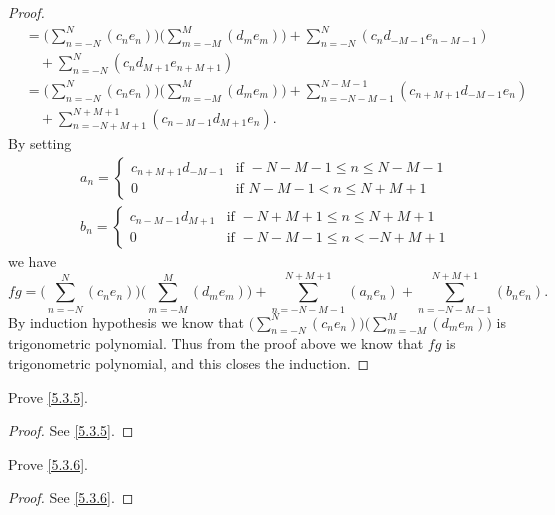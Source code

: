\begin{proof}
\begin{align*}
        & = \bigg(\sum_{n = -N}^N (c_n e_n)\bigg) \bigg(\sum_{m = -M}^M (d_m e_m)\bigg) + \sum_{n = -N}^N (c_n d_{-M - 1} e_{n - M - 1})                   \\
        & \quad + \sum_{n = -N}^N (c_n d_{M + 1} e_{n + M + 1})                                                                                            \\
        & = \bigg(\sum_{n = -N}^N (c_n e_n)\bigg) \bigg(\sum_{m = -M}^M (d_m e_m)\bigg) + \sum_{n = -N - M - 1}^{N - M - 1} (c_{n + M + 1} d_{-M - 1} e_n) \\
        & \quad + \sum_{n = -N + M + 1}^{N + M + 1} (c_{n - M - 1} d_{M + 1} e_n).
  \end{align*}
  By setting
  \begin{align*}
     & a_n = \begin{cases}
               c_{n + M + 1} d_{-M - 1} & \text{if } -N - M - 1 \leq n \leq N - M - 1 \\
               0                        & \text{if } N - M - 1 < n \leq N + M + 1
             \end{cases} \\
     & b_n = \begin{cases}
               c_{n - M - 1} d_{M + 1} & \text{if } -N + M + 1 \leq n \leq N + M + 1 \\
               0                       & \text{if } -N - M - 1 \leq n < -N + M + 1
             \end{cases}
  \end{align*}
  we have
  \[
    fg = \bigg(\sum_{n = -N}^N (c_n e_n)\bigg) \bigg(\sum_{m = -M}^M (d_m e_m)\bigg) + \sum_{n = -N - M - 1}^{N + M + 1} (a_n e_n) + \sum_{n = -N - M - 1}^{N + M + 1} (b_n e_n).
  \]
  By induction hypothesis we know that \(\bigg(\sum_{n = -N}^N (c_n e_n)\bigg) \bigg(\sum_{m = -M}^M (d_m e_m)\bigg)\) is trigonometric polynomial.
  Thus from the proof above we know that \(fg\) is trigonometric polynomial, and this closes the induction.
\end{proof}

\begin{exercise}\label{ex 5.3.2}
  Prove \cref{5.3.5}.
\end{exercise}

\begin{proof}
  See \cref{5.3.5}.
\end{proof}

\begin{exercise}\label{ex 5.3.3}
  Prove \cref{5.3.6}.
\end{exercise}

\begin{proof}
  See \cref{5.3.6}.
\end{proof}